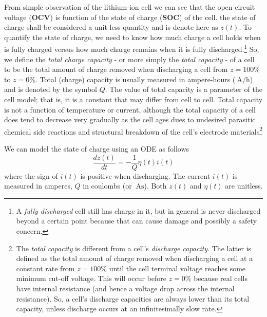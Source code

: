 \documentclass[11pt,a4paper,oneside]{book}
\numberwithin{equation}{section}
\theoremstyle{it}
\theoremstyle{definition}
\begin{document}
From simple observation of the lithium-ion cell we can see that the open circuit voltage ($\mathbf{OCV}$) is function of the state of charge ($\mathbf{SOC}$) of the cell. the state of charge shall be considered a unit-less quantity and is denote here as $z(t)$. To quantify the state of charge, we need to know how much charge a cell holds when is fully charged versus how much charge remains when it is fully discharged.\footnote{A \textit{fully discharged} cell still has charge in it, but in general is never discharged beyond a certain point because that can cause damage and possibly a safety concern.} So, we define the \textit{total charge capacity} - or more simply the \textit{total capacity} - of a cell to be the total amount of charge removed when discharging a cell from $z=100\%$ to $z=0\%$. Total (charge) capacity is usually measured in ampere-hours ($\SI{}{\ampere\per\hour}$) and is denoted by the symbol $Q$. The value of total capacity is a parameter of the cell model; that is, it is a constant that may differ from cell to cell. Total capacity is not a function of temperature or current, although the total capacity of a cell does tend to decrease very gradually as the cell ages dues to undesired parasitic chemical side reactions and structural breakdown of the cell's electrode materials\footnote{The \textit{total capacity} is different from a cell's \textit{discharge capacity}. The latter is defined as the total amount of charge removed when discharging a cell at a constant rate from $z=100\%$ until the cell terminal voltage reaches some minimum cut-off voltage. This will occur before $z=0\%$ because real cells have internal resistance (and hence a voltage drop across the internal resistance). So, a cell's discharge capacities are always lower than its total capacity, unless discharge occurs at an infinitesimally slow rate.}

We can model the state of charge using an ODE as follows
\begin{equation}
	\frac{dz(t)}{dt} = -\frac{1}{Q}\eta(t)i(t)
\end{equation}
where the sign of $i(t)$ is positive when discharging. The current $i(t)$ is measured in amperes, $Q$ in coulombs (or $\SI{}{\ampere\second}$). Both $z(t)$ and $\eta(t)$ are unitless.
\end{document}

